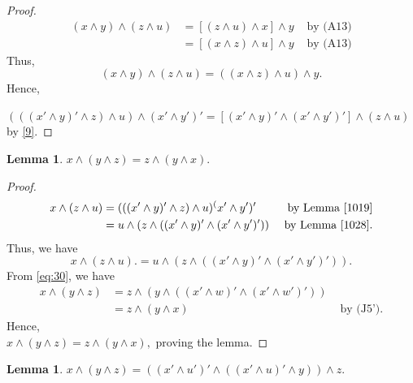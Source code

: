 \documentclass{amsart}
\theoremstyle{plain}
\newtheorem{lemma}[theorem]{Lemma}
\theoremstyle{problem}
\theoremstyle{definition}
\theoremstyle{remark}
\numberwithin{equation}{section}
\begin{document}
\begin{proof}  
\begin{align*}  
(x \land y) \land (z \land u) &= [(z \land u) \land x] \land y  &\text{ by (A13)}\\
                                               & =[(x \land z) \land u] \land  y  &\text{ by (A13)}
\end{align*}
Thus,
\begin{equation}\label{9}
  (x \land y) \land (z \land u) = ((x \land z) \land u) \land y.  
\end{equation}
Hence,

$(((x' \land y)' \land z) \land u) \land (x' \land y')' 
                                  = [(x' \land y)' \land (x' \land y')'] \land (z \land u)$ \quad by \ref{9}.
\end{proof}


\begin{lemma} \label{1031} 
 $x \land (y \land z) = z \land (y \land x).$  
\end{lemma}

\begin{proof}  
\begin{align*}                      
x \land (z \land u) &= (((x' \land y)' \land z) \land u) ^ (x' \land y')'  &\text{ by Lemma \ref{1019}} \\ 
                              &= u \land (z  \land ((x' \land y)' \land (x' \land y')')) &\text{ by  Lemma \ref{1028}}.
 \end{align*}
 Thus, we have
 \begin{equation} \label{eq:30}
 x \land (z \land u). = u \land (z \land ((x' \land y)' \land (x' \land y')')).  
\end{equation}
From \ref{eq:30}, we have
\begin{align*}              
x \land (y \land z) &= z \land (y \land ((x' \land w)' \land (x' \land w')')) \\
                               &= z \land (y \land x) &\text{  by (J5')}.
\end{align*}
Hence,\\
 $x \land (y \land z) = z \land (y \land x),$ 
 proving the lemma.
\end{proof}


\begin{lemma} \label{1023}  
 $x \land (y \land z) = ((x' \land u')' \land ((x' \land u)' \land y)) \land z. $  
\end{lemma}
\end{document}
